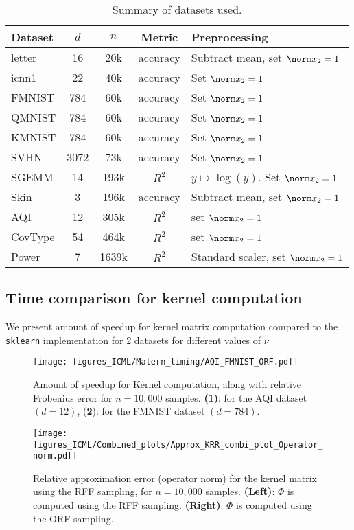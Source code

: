 \documentclass{article}
\theoremstyle{plain}
\begin{document}
\begin{table}[h]
\centering

\caption{\label{tab:datasets}Summary of datasets used.}
\begin{tabular}{lcccl}
\toprule
    Dataset & $d$ & $n$ & Metric & Preprocessing\\
\midrule
    letter & 16 & 20k & accuracy & Subtract mean, set $\norm x_2=1$\\ 
    icnn1 & 22 & 40k & accuracy & Set $\norm x_2=1$\\ 
    FMNIST & 784 & 60k & accuracy& Set $\norm x_2=1$\\ 
    QMNIST & 784 & 60k & accuracy & Set $\norm x_2=1$\\ 
    KMNIST & 784 & 60k & accuracy & Set $\norm x_2=1$\\ 
    SVHN & 3072 & 73k & accuracy & Set $\norm x_2=1$\\ 
    SGEMM & 14 & 193k & $R^2$ & $y\mapsto\log(y)$. Set $\norm x_2=1$  \\ 
    Skin & 3 & 196k & accuracy & Subtract mean, set $\norm x_2=1$\\ 
    AQI & 12 & 305k & $R^2$ & set $\norm x_2=1$\\ 
    CovType & 54 & 464k & $R^2$ & set $\norm x_2=1$\\ 
    Power & 7 & 1639k & $R^2$ & Standard scaler, set $\norm x_2=1$\\
\bottomrule
\end{tabular}
\end{table}

\subsection{Time comparison for kernel computation}
We present amount of speedup for kernel matrix computation compared to the \texttt{sklearn} implementation for 2 datasets for different values of $\nu$

\begin{figure}[!htb]
\begin{center}
\centerline{\texttt{[image: figures\_ICML/Matern\_timing/AQI\_FMNIST\_ORF.pdf]}}
\caption{Amount of speedup for Kernel computation, along with relative Frobenius error for $n=10,000$ samples. \textbf{(1)}: for the AQI dataset $(d=12)$, (\textbf{2}): for the FMNIST dataset $(d=784)$.}
\end{center}
\vskip -0.2in
\end{figure}

\begin{figure}
\texttt{[image: figures\_ICML/Combined\_plots/Approx\_KRR\_combi\_plot\_Operator\_norm.pdf]}
\caption{\label{fig:approx_op_norm}Relative approximation error (operator norm) for the kernel matrix using the RFF sampling, for $n=10,000$ samples. \textbf{(Left)}: $\Phi$ is computed using the RFF sampling. \textbf{(Right)}: $\Phi$ is computed using the ORF sampling.}
\end{figure}
\end{document}
